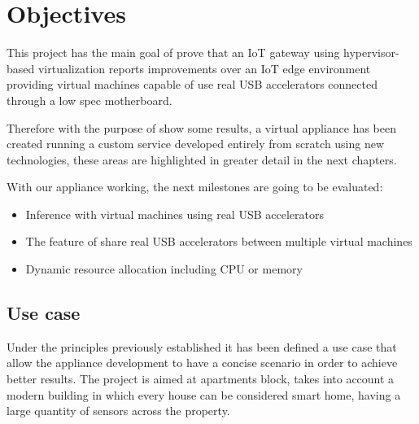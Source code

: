 \newpage
\section{Objectives}
\label{makereference1.2}

This project has the main goal of prove that an IoT gateway using hypervisor-based virtualization reports improvements over an IoT edge environment providing virtual machines capable of use real USB accelerators connected through a low spec motherboard.

Therefore with the purpose of show some results, a virtual appliance has been created running a custom service developed entirely from scratch using new technologies, these areas are highlighted in greater detail in the next chapters. 

With our appliance working, the next milestones are going to be evaluated:

\begin{itemize}
  \item Inference with virtual machines using real USB accelerators
  \item The feature of share real USB accelerators between multiple virtual machines
  \item Dynamic resource allocation including CPU or memory 
\end{itemize}

\subsection{Use case}
\label{makereference1.2.1}
Under the principles previously established it has been defined a use case that allow the appliance development to have a concise scenario in order to achieve better results. The project is aimed at apartments block, takes into account a modern building in which every house can be considered smart home, having a large quantity of sensors across the property.

